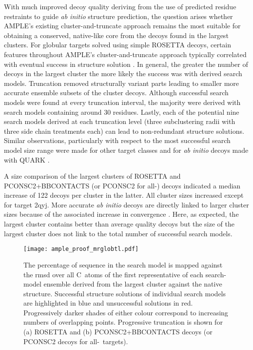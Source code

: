 With much improved decoy quality deriving from the use of predicted residue restraints to guide \textit{ab initio} structure prediction, the question arises whether AMPLE's existing cluster-and-truncate approach remains the most suitable for obtaining a conserved, native-like core from the decoys found in the largest clusters. For globular targets solved using simple ROSETTA decoys, certain features throughout AMPLE's cluster-and-truncate approach typically correlated with eventual success in structure solution \cite{Bibby2012-lm}. In general, the greater the number of decoys in the largest cluster the more likely the success was with derived search models. Truncation removed structurally variant parts leading to smaller more accurate ensemble subsets of the cluster decoys. Although successful search models were found at every truncation interval, the majority were derived with search models containing around 30 residues. Lastly, each of the potential nine search models derived at each truncation level (three subclustering radii with three side chain treatments each) can lead to non-redundant structure solutions. Similar observations, particularly with respect to the most successful search model size range were made for other target classes \cite{Thomas2017-sh, Thomas2015-wu} and for \textit{ab initio} decoys made with QUARK \cite{Keegan2015-zb}.

A size comparison of the largest clusters of ROSETTA and PCONSC2+BBCONTACTS (or PCONSC2 for all-\textalpha) decoys indicated a median increase of 122 decoys per cluster in the latter. All cluster sizes increased except for target 2qyj. More accurate \textit{ab initio} decoys are directly linked to larger cluster sizes because of the associated increase in convergence \cite{Simons1997-oe}. Here, as expected, the largest cluster contains better than average quality decoys but the size of the largest cluster does not link to the total number of successful search models.  

\begin{figure}[H]
    \centering
    \texttt{[image: ample\_proof\_mrglobtl.pdf]}
    \caption[Effect of progressive truncation on RMSD of ensemble centroid]{The percentage of sequence in the search model is mapped against the \gls{rmsd} over all C\textalpha\ atoms of the first representative of each search-model ensemble derived from the largest cluster against the native structure. Successful structure solutions of individual search models are highlighted in blue and unsuccessful solutions in red.  Progressively darker shades of either colour correspond to increasing numbers of overlapping points.  Progressive truncation is shown for (a) ROSETTA and (b) PCONSC2+BBCONTACTS decoys (or PCONSC2 decoys for all-\textalpha\ targets).}
    \label{fig:ample_proof_mrglobtl}
\end{figure}

